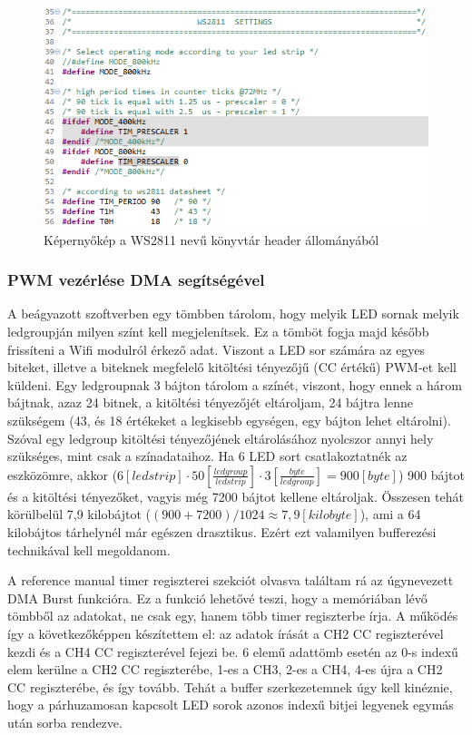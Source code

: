 \documentclass[../main.tex]{subfiles}
\begin{document}
            \begin{figure}[h!]
                \centering
                    \includegraphics[width=12cm]{mbed_res/ws2811_timing_values}
                \caption{Képernyőkép a WS2811 nevű könyvtár header állományából}
                \label{fig:ws2811_timing_values}
            \end{figure}
         
        \subsubsection{PWM vezérlése DMA segítségével}  
             A beágyazott szoftverben egy tömbben tárolom, hogy melyik LED sornak melyik ledgroupján milyen színt kell megjelenítsek. Ez a tömböt fogja majd később frissíteni a Wifi modulról érkező adat. Viszont a LED sor számára az egyes biteket, illetve a biteknek megfelelő kitöltési tényezőjű (CC értékű) PWM-et kell küldeni. Egy ledgroupnak 3 bájton tárolom a színét, viszont, hogy ennek a három bájtnak, azaz 24 bitnek, a kitöltési tényezőjét eltároljam, 24 bájtra lenne szükségem (43, és 18 értékeket a legkisebb egységen, egy bájton lehet eltárolni). Szóval egy ledgroup kitöltési tényezőjének eltárolásához nyolcszor annyi hely szükséges, mint csak a színadataihoz. Ha 6 LED sort csatlakoztatnék az eszközömre, akkor ($ 6[ledstrip]\cdot 50 [\frac{ledgroup}{ledstrip}] \cdot 3 [\frac{byte}{ledgroup}] = 900 [byte]$) 900 bájtot és a kitöltési tényezőket, vagyis még 7200 bájtot kellene eltároljak. Összesen tehát körülbelül 7,9 kilobájtot ($ (900+7200)/1024 \approx 7,9[kilobyte]$), ami a 64 kilobájtos tárhelynél már egészen drasztikus. Ezért ezt valamilyen bufferezési technikával kell megoldanom.
             
             A reference manual \cite{rm0008} timer regiszterei szekciót olvasva találtam rá az úgynevezett DMA Burst funkcióra. Ez a funkció lehetővé teszi, hogy a memóriában lévő tömbből az adatokat, ne csak egy, hanem több timer regiszterbe írja. A működés így a következőképpen készítettem el: az adatok írását a CH2 CC regiszterével kezdi és a CH4 CC regiszterével fejezi be. 6 elemű adattömb esetén az 0-s indexű elem kerülne a CH2 CC regiszterébe, 1-es a CH3, 2-es a CH4, 4-es újra a CH2 CC regiszterébe, és így tovább. Tehát a buffer szerkezetemnek úgy kell kinéznie, hogy a párhuzamosan kapcsolt LED sorok azonos indexű bitjei legyenek egymás után sorba rendezve.
             
\end{document}
